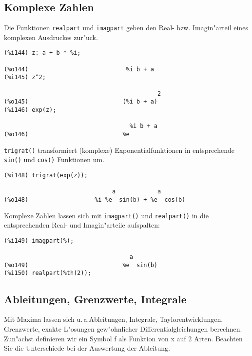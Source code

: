 \documentclass[ngerman,12pt,a4paper]{article}
\begin{document}
\subsection{Komplexe Zahlen}


Die Funktionen \verb|realpart| und \verb|imagpart| geben den Real- bzw. Imagin"arteil eines komplexen Ausdruckes zur"uck.

\scriptsize
\begin{verbatim}
(%i144) z: a + b * %i;

(%o144)                            %i b + a
(%i145) z^2;

                                            2
(%o145)                           (%i b + a)
(%i146) exp(z);

                                    %i b + a
(%o146)                           %e
\end{verbatim}
\normalsize

\verb|trigrat()| transformiert (komplexe) Exponentialfunktionen in entsprechende \verb|sin()| und \verb|cos()| Funktionen um.

\scriptsize
\begin{verbatim}
(%i148) trigrat(exp(z));

                               a            a
(%o148)                   %i %e  sin(b) + %e  cos(b)
\end{verbatim}
\normalsize

Komplexe Zahlen lassen sich mit \verb|imagpart()| und \verb|realpart()| in die entsprechenden Real- und Imagin"arteile aufspalten:

\scriptsize
\begin{verbatim}
(%i149) imagpart(%);

                                    a
(%o149)                           %e  sin(b)
(%i150) realpart(%th(2));
\end{verbatim}
\normalsize


\subsection{Ableitungen, Grenzwerte, Integrale}


Mit Maxima lassen sich u.\,a.\@ Ableitungen, Integrale, Taylorentwicklungen, Grenzwerte, exakte L"osungen gew"ohnlicher Differentialgleichungen berechnen.
Zun"achst definieren wir ein Symbol f als Funktion von x auf 2 Arten. Beachten Sie die Unterschiede bei der Auswertung der Ableitung.
\end{document}
